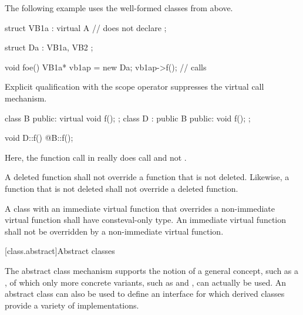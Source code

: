 \pnum
\begin{example}
The following example uses the well-formed classes from above.
\begin{codeblock}
struct VB1a : virtual A {       // does not declare 
};

struct Da : VB1a, VB2 {
};

void foe() {
  VB1a*  vb1ap = new Da;
  vb1ap->f();                   // calls 
}
\end{codeblock}
\end{example}

\pnum
{}%
%
Explicit qualification with the scope operator
suppresses the virtual call mechanism.
\begin{example}
\begin{codeblock}
class B { public: virtual void f(); };
class D : public B { public: void f(); };

void D::f() { @\commentellip@ B::f(); }
\end{codeblock}

Here, the function call in
really does call
and not
.
\end{example}

\pnum
A deleted function shall
not override a function that is not deleted. Likewise,
a function that is not deleted shall not override a
deleted function.%

\pnum
A class with an immediate virtual function that overrides
a non-immediate virtual function
shall have consteval-only type.
An immediate virtual function shall not be overridden by
a non-immediate virtual function.

[class.abstract]{Abstract classes}%

\pnum
\begin{note}
The abstract class mechanism supports the notion of a general concept,
such as a , of which only more concrete variants, such as
 and , can actually be used. An abstract
class can also be used to define an interface for which derived classes
provide a variety of implementations.
\end{note}

